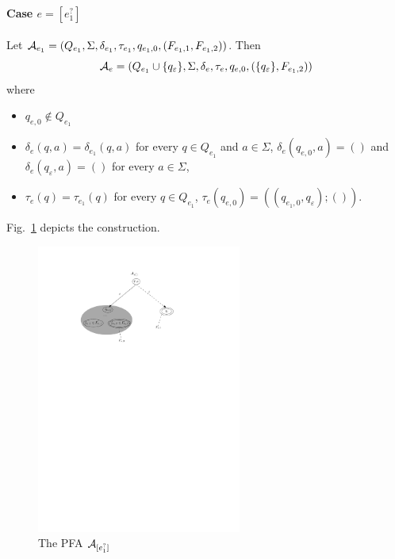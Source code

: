 
\paragraph{Case $e = [e_1^?]$} Let $\mathcal{A}_{e_1} = (Q_{e_1}, \Sigma, \delta_{e_1}, \tau_{e_1}, q_{e_1,0}, (F_{e_1,1}, F_{e_1,2}))$. Then 
\[\mathcal{A}_e = (Q_{e_1} \cup \{q_{\varepsilon}\}, \Sigma,
		\delta_e, \tau_e, q_{e,0}, (\{q_{\varepsilon}\}, F_{e_1,2}))\]
where  
		\begin{itemize}
			\item $q_{e,0}  \not \in Q_{e_1}$
			\item $\delta_e(q, a) = \delta_{e_1}(q, a)$ for every $q \in Q_{e_1}$ and $a \in \Sigma$, $\delta_e(q_{e,0}, a)  = ()$ and $\delta_e(q_{\varepsilon}, a) = ()$ for every $a \in \Sigma$, 
			\item $\tau_e(q) = \tau_{e_1}(q)$ for every $q \in Q_{e_1}$, $\tau_e(q_{e,0}) = ((q_{e_1,0},q_{\varepsilon}); ())$.
		\end{itemize}
%
Fig.~\ref{fig-reg2pfa-6} depicts the construction.
		\begin{figure}[ht]
			\centering
			\includegraphics[width = 0.6\textwidth]{reg2pfa-6.pdf}
			\caption{The PFA $\mathcal{A}_{[e_1^?]}$}
			\label{fig-reg2pfa-6}
		\end{figure}

